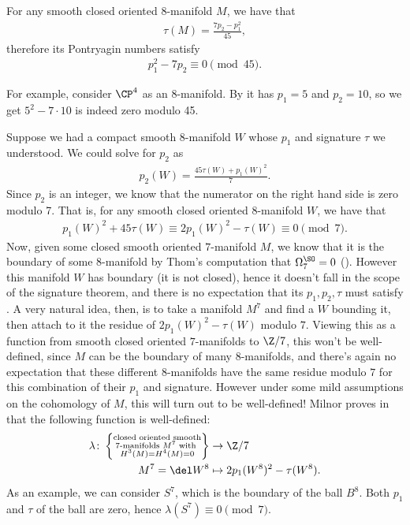 \documentclass[11pt]{book}
\begin{document}
\begin{example} For any smooth closed oriented $8$-manifold $M$, we have that
\begin{align*}
    \tau(M) = \frac{7p_2 - p_1^2}{45},
\end{align*}
therefore its Pontryagin numbers satisfy
\begin{align*}
    p_1^2 - 7p_2 \equiv 0 \pmod{45}.
\end{align*}
\end{example}

For example, consider $\CP^4$ as an 8-manifold. By  it has $p_1 =5$ and $p_2 = 10$, so we get $5^2 - 7\cdot 10$ is indeed zero modulo 45.

\begin{example} Suppose we had a compact smooth 8-manifold $W$ whose $p_1$ and signature $\tau$ we understood. We could solve for $p_2$ as
\begin{align*}
    p_2(W) = \frac{45\tau(W) + p_1(W)^2}{7}.
\end{align*}
%
Since $p_2$ is an integer, we know that the numerator on the right hand side is zero modulo 7. That is, for any smooth closed oriented $8$-manifold $W$, we have that
\begin{equation}\label{eqn:p2-mod-7-for-8-manifolds}
\begin{aligned}
    p_1(W)^2 + 45\tau(W) \equiv 2p_1(W)^2 - \tau(W) \equiv 0 \pmod{7}.
\end{aligned}
\end{equation}
%
Now, given some closed smooth oriented $7$-manifold $M$, we know that it is the boundary of some $8$-manifold by Thom's computation that $\Omega_7^\SO = 0$ (). However this manifold $W$ has boundary (it is not closed), hence it doesn't fall in the scope of the signature theorem, and there is no expectation that its $p_1,p_2,\tau$ must satisfy . A very natural idea, then, is to take a manifold $M^7$ and find a $W$ bounding it, then attach to it the residue of $2p_1(W)^2 - \tau(W)$ modulo $7$. Viewing this as a function from smooth closed oriented $7$-manifolds to $\Z/7$, this won't be well-defined, since $M$ can be the boundary of many $8$-manifolds, and there's again no expectation that these different $8$-manifolds have the same residue modulo $7$ for this combination of their $p_1$ and signature. However under some mild assumptions on the cohomology of $M$, this will turn out to be well-defined! Milnor proves in \cite[Theorem~1]{milnorManifoldsHomeomorphic7Sphere1956} that the following function is well-defined:
\begin{align*}
    \lambda \colon \left\{ \substack{\text{closed oriented smooth} \\ \text{7-manifolds }M^7 \text{ with }\\ H^3(M) = H^4(M)=0} \right\} &\to \Z/7 \\
    M^7 = \del W^8 &\mapsto 2p_1(W^8)^2 - \tau(W^8).
\end{align*}
%
As an example, we can consider $S^7$, which is the boundary of the ball $B^8$. Both $p_1$ and $\tau$ of the ball are zero, hence $\lambda(S^7) \equiv 0 \pmod{7}$.


\end{example}
\end{document}
